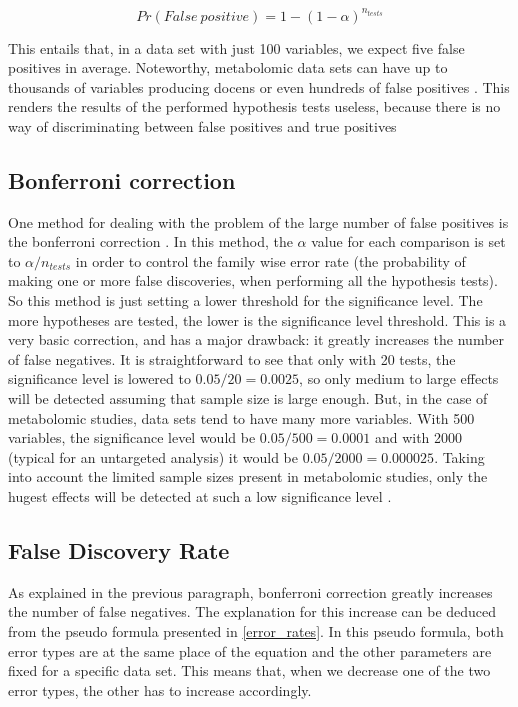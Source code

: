 \begin{equation}
\label{falsos_positivos}
    Pr(False\ positive) = 1-(1-\alpha)^{n_{tests}}
\end{equation}

This entails that, in a data set with just 100 variables, we expect five false positives in average. Noteworthy, metabolomic data sets can have up to thousands of variables producing docens or even hundreds of false positives \parencite{broadhurst2006statistical}. This renders the results of the performed hypothesis tests useless, because there is no way of discriminating between false positives and true positives

\subsection{Bonferroni correction}
One method for dealing with the problem of the large number of false positives is the bonferroni correction \parencite{bland1995multiple}. In this method, the $\alpha$ value for each comparison is set to $\alpha /n_{tests}$ in order to control the family wise error rate (the probability of making one or more false discoveries, when performing all the hypothesis tests). So this method is just setting a lower threshold for the significance level. The more hypotheses are tested, the lower is the significance level threshold. This is a very basic correction, and has a major drawback: it greatly increases the number of false negatives. It is straightforward to see that only with 20 tests, the significance level is lowered to $0.05/20 = 0.0025$, so only medium to large effects will be detected assuming that sample size is large enough. But, in the case of metabolomic studies, data sets tend to have many more variables. With 500 variables, the significance level would be $0.05/500=0.0001$ and with 2000 (typical for an untargeted analysis) it would be $0.05/2000=0.000025$. Taking into account the limited sample sizes present in metabolomic studies, only the hugest effects will be detected at such a low significance level \parencite{johnson2010accounting}. 

\subsection{False Discovery Rate}
As explained in the previous paragraph, bonferroni correction greatly increases the number of false negatives. The explanation for this increase can be deduced from the pseudo formula presented in \autoref{error_rates}. In this pseudo formula, both error types are at the same place of the equation and the other parameters are fixed for a specific data set. This means that, when we decrease one of the two error types, the other has to increase accordingly.

